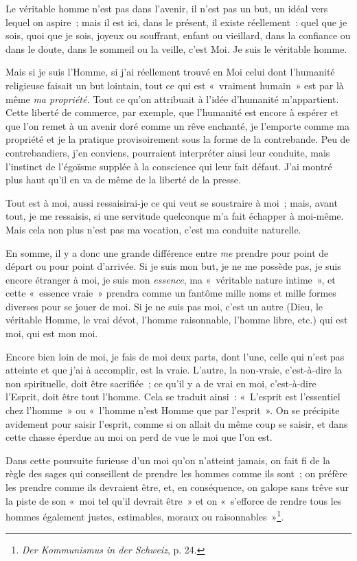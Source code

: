 \documentclass[french,twoside]{book} %
\begin{document}
Le véritable homme n’est pas dans l’avenir, il n’est  pas un but, un idéal vers lequel on aspire ; mais il est ici, dans le présent, il existe réellement : quel que je sois, quoi que je sois, joyeux ou souffrant, enfant ou vieillard, dans la confiance ou dans le doute, dans le sommeil ou la veille, c’est Moi. Je suis le véritable homme.\par
Mais si je suis l’Homme, si j’ai réellement trouvé en Moi celui dont l’humanité religieuse faisait un but lointain, tout ce qui est « vraiment humain » est par là même \emph{ma propriété.} Tout ce qu’on attribuait à l’idée d’humanité m’appartient. Cette liberté de commerce, par exemple, que l’humanité est encore à espérer et que l’on remet à un avenir doré comme un rêve enchanté, je l’emporte comme ma propriété et je la pratique provisoirement sous la forme de la contrebande. Peu de contrebandiers, j’en conviens, pourraient interpréter ainsi leur conduite, mais l’instinct de l’égoïsme supplée à la conscience qui leur fait défaut. J’ai montré plus haut qu’il en va de même de la liberté de la presse.\par
Tout est à moi, aussi ressaisirai-je ce qui veut se soustraire à moi ; mais, avant tout, je me ressaisis, si une servitude quelconque m’a fait échapper à moi-même. Mais cela non plus n’est pas ma vocation, c’est ma conduite naturelle.\par
En somme, il y a donc une grande différence entre \emph{me} prendre pour point de départ ou pour point d’arrivée. Si je suis mon but, je ne me possède pas, je suis encore étranger à moi, je suis mon \emph{essence}, ma « véritable nature intime », et cette « essence vraie » prendra comme un fantôme mille noms et mille formes diverses pour se jouer de moi. Si je ne suis pas moi, c’est un autre (Dieu, le véritable Homme, le vrai dévot, l’homme raisonnable, l’homme libre, etc.) qui est moi, qui est mon moi.\par
Encore bien loin de moi, je fais de moi deux parts, dont l’une, celle qui n’est pas atteinte et que j’ai à accomplir, est la vraie. L’autre, la non-vraie, c’est-à-dire  la non spirituelle, doit être sacrifiée ; ce qu’il y a de vrai en moi, c’est-à-dire l’Esprit, doit être tout l’homme. Cela se traduit ainsi : « L’esprit est l’essentiel chez l’homme » ou « l’homme n’est Homme que par l’esprit ». On se précipite avidement pour saisir l’esprit, comme si on allait du même coup se saisir, et dans cette chasse éperdue au moi on perd de vue le moi que l’on est.\par
Dans cette poursuite furieuse d’un moi qu’on n’atteint jamais, on fait fi de la règle des sages qui conseillent de prendre les hommes comme ils sont ; on préfère les prendre comme ils devraient être, et, en conséquence, on galope sans trêve sur la piste de son « moi tel qu’il devrait être » et on « s’efforce de rendre tous les hommes également justes, estimables, moraux ou raisonnables »\footnote{ \noindent \emph{Der Kommunismus in der Schweiz}, p. 24.
 }.\par
\end{document}
